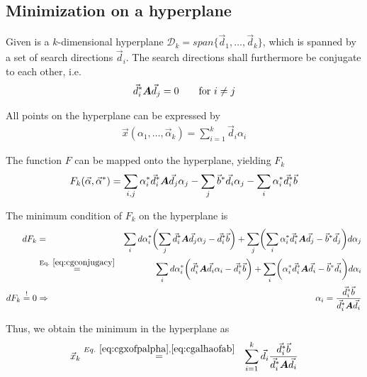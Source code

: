 \documentclass[11pt,a4paper]{report}
\begin{document}
\subsection{Minimization on a hyperplane}
Given is a $k$-dimensional hyperplane
$\mathcal{D}_k=span\{\vec{d}_1,\ldots,\vec{d}_k\}$, which is spanned
by a set of search directions $\vec{d}_i$. The search directions shall
furthermore be conjugate to each other, i.e.
\begin{eqnarray}
\vec{d}_i^*\bm{A}\vec{d}_j=0\qquad\text{for $i\neq j$}
\label{eq:cgconjugacy}
\end{eqnarray}

All points on the hyperplane can be expressed by
\begin{eqnarray}
\vec{x}(\alpha_1,\ldots,\vec{\alpha}_k)=\sum_{i=1}^k\vec{d}_i\alpha_i
\label{eq:cgxofpalpha}
\end{eqnarray}

The function $F$ can be mapped onto the hyperplane, yielding $F_k$
\begin{eqnarray}
F_k(\vec{\alpha},\vec{\alpha}^*)
=\sum_{i,j} \alpha_i^* \vec{d}^*_i\bm{A}\vec{d}_j\alpha_j
-\sum_j \vec{b}^*\vec{d}_i\alpha_j
-\sum_i \alpha_i^*\vec{d}^*_i\vec{b}
\end{eqnarray}

The minimum condition of $F_k$ on the hyperplane is
\begin{eqnarray}
dF_k
&=&\sum_id\alpha_i^*\biggl(\sum_{j}\vec{d}^*_i\mat{A}\vec{d}_j\alpha_j
-\vec{d}^*_i\vec{b}\biggr)
+\sum_{j} 
\biggl(\sum_{i} \alpha_i^* \vec{d}^*_i\mat{A}\vec{d}_j
-\vec{b}^*\vec{d}_j\biggr)d\alpha_j
\nonumber\\
&\eqrel{eq:cgconjugacy}{=}&
\sum_id\alpha_i^*\biggl(\vec{d}^*_i\mat{A}\vec{d}_i\alpha_i
-\vec{d}^*_i\vec{b}\biggr)
+\sum_{i} 
\biggl( \alpha_i^* \vec{d}^*_i\mat{A}\vec{d}_i
-\vec{b}^*\vec{d}_i\biggr)d\alpha_i
\nonumber\\
dF_k\stackrel{!}{=}0&\Rightarrow&
\alpha_i=\frac{\vec{d}^*_i\vec{b}}{\vec{d}^*_i\mat{A}\vec{d}_i}
\label{eq:cgalhaofab}
\end{eqnarray}

Thus, we obtain the minimum in the hyperplane as 
\begin{eqnarray}
\vec{x}_k&
\stackrel{Eq.~\ref{eq:cgxofpalpha},\ref{eq:cgalhaofab}}{=}
&\sum_{i=1}^k\vec{d}_i
\frac{\vec{d}^*_i\vec{b}}{\vec{d}^*_i\bm{A}\vec{d}_i}
\end{eqnarray}
\end{document}
